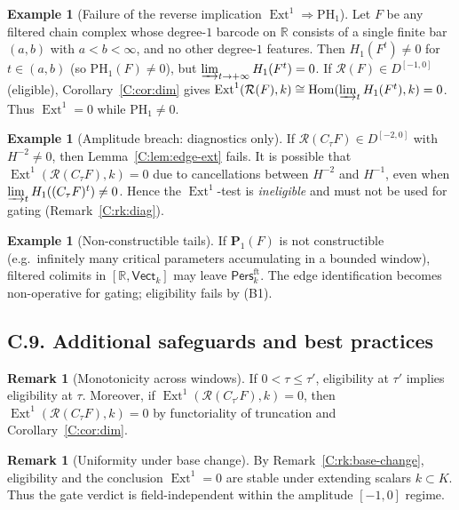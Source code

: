 \documentclass[11pt]{article}
\numberwithin{equation}{section}
\theoremstyle{plain}
\theoremstyle{definition}
\theoremstyle{remark}
\DeclareMathOperator{\Ext}{Ext}
\DeclareMathOperator{\Hom}{Hom}
\newcommand{\Pers}{\mathsf{Pers}}
\theoremstyle{plain}
\theoremstyle{definition}
\numberwithin{equation}{section}
\theoremstyle{definition}
\newtheorem{example}[theorem]{Example}
\newtheorem{remark}[theorem]{Remark}
\numberwithin{equation}{section}
\theoremstyle{plain}
\theoremstyle{definition}
\theoremstyle{remark}
\begin{document}
\begin{example}[Failure of the reverse implication \(\Ext^1\Rightarrow \mathrm{PH}_1\)]\label{C:ex:reverse-false}
Let \(F\) be any filtered chain complex whose degree-\(1\) barcode on \(\mathbb{R}\) consists of a single finite bar \((a,b)\) with \(a<b<\infty\), and no other degree-\(1\) features.
Then \(H_1(F^t)\neq 0\) for \(t\in(a,b)\) (so \(\mathrm{PH}_1(F)\neq 0\)), but \(\varinjlim_{t\to+\infty}H_1(F^t)=0\).
If \(\mathcal{R}(F)\in D^{[-1,0]}\) (eligible), Corollary~\ref{C:cor:dim} gives
\(\Ext^1(\mathcal{R}(F),k)\cong \Hom(\varinjlim_t H_1(F^t),k)=0\).
Thus \(\Ext^1=0\) while \(\mathrm{PH}_1\neq 0\).
\end{example}

\begin{example}[Amplitude breach: diagnostics only]\label{C:ex:amplitude-breach}
If \(\mathcal{R}(C_\tau F)\in D^{[-2,0]}\) with \(H^{-2}\neq 0\), then Lemma~\ref{C:lem:edge-ext} fails.
It is possible that \(\Ext^1(\mathcal{R}(C_\tau F),k)=0\) due to cancellations between \(H^{-2}\) and \(H^{-1}\), even when \(\varinjlim_t H_1((C_\tau F)^t)\neq 0\).
Hence the \(\Ext^1\)-test is \emph{ineligible} and must not be used for gating (Remark~\ref{C:rk:diag}).
\end{example}

\begin{example}[Non-constructible tails]\label{C:ex:nonconstructible}
If \(\mathbf{P}_1(F)\) is not constructible (e.g.\ infinitely many critical parameters accumulating in a bounded window), filtered colimits in \([\mathbb{R},\mathsf{Vect}_k]\) may leave \(\Pers^{\mathrm{ft}}_k\).
The edge identification becomes non-operative for gating; eligibility fails by \textup{(B1)}.
\end{example}

\subsection*{C.9. Additional safeguards and best practices}

\begin{remark}[Monotonicity across windows]
If \(0<\tau\le \tau'\), eligibility at \(\tau'\) implies eligibility at \(\tau\).
Moreover, if \(\Ext^1(\mathcal{R}(C_{\tau'}F),k)=0\), then \(\Ext^1(\mathcal{R}(C_{\tau}F),k)=0\) by functoriality of truncation and Corollary~\ref{C:cor:dim}.
\end{remark}

\begin{remark}[Uniformity under base change]
By Remark~\ref{C:rk:base-change}, eligibility and the conclusion \(\Ext^1=0\) are stable under extending scalars \(k\subset K\).
Thus the gate verdict is field-independent within the amplitude \([-1,0]\) regime.
\end{remark}
\end{document}
